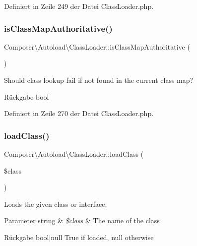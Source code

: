 Definiert in Zeile 249 der Datei Class\+Loader.\+php.

\mbox{\label{class_composer_1_1_autoload_1_1_class_loader_abaf3d2e9cad5d740b6a29c44b36cf015}} 
\subsubsection{\texorpdfstring{is\+Class\+Map\+Authoritative()}{isClassMapAuthoritative()}}
{\footnotesize\ttfamily Composer\textbackslash{}\+Autoload\textbackslash{}\+Class\+Loader\+::is\+Class\+Map\+Authoritative (\begin{DoxyParamCaption}{ }\end{DoxyParamCaption})}

Should class lookup fail if not found in the current class map?

\begin{DoxyReturn}{Rückgabe}
bool 
\end{DoxyReturn}


Definiert in Zeile 270 der Datei Class\+Loader.\+php.

\mbox{\label{class_composer_1_1_autoload_1_1_class_loader_aee0b004fbf0743f16dab70f8a52f983e}} 
\subsubsection{\texorpdfstring{load\+Class()}{loadClass()}}
{\footnotesize\ttfamily Composer\textbackslash{}\+Autoload\textbackslash{}\+Class\+Loader\+::load\+Class (\begin{DoxyParamCaption}\item[{}]{\$class }\end{DoxyParamCaption})}

Loads the given class or interface.


\begin{DoxyParams}[1]{Parameter}
string & {\em \$class} & The name of the class \\
\hline
\end{DoxyParams}
\begin{DoxyReturn}{Rückgabe}
bool$\vert$null True if loaded, null otherwise 
\end{DoxyReturn}


